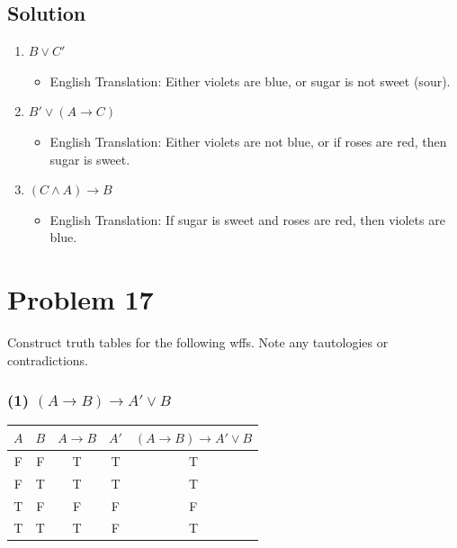 \documentclass[12pt]{article}
\begin{document}
\subsection*{Solution}
\begin{enumerate}
    \item \( B \lor C' \)
    \begin{itemize}
        \item English Translation: Either violets are blue, or sugar is not sweet (sour).
    \end{itemize}
    
    \item \( B' \lor (A \rightarrow C) \)
    \begin{itemize}
        \item English Translation: Either violets are not blue, or if roses are red, then sugar is sweet.
    \end{itemize}
    
    \item \( (C \land A) \rightarrow B \)
    \begin{itemize}
        \item English Translation: If sugar is sweet and roses are red, then violets are blue.
    \end{itemize}
\end{enumerate}


\newpage
\section*{Problem 17}
Construct truth tables for the following wffs. Note any tautologies or contradictions.

\subsubsection*{(1) \( (A \rightarrow B) \rightarrow A' \lor B \)}
\begin{tabular}{|c|c|c|c|c|}
\hline
\( A \) & \( B \) & \( A \rightarrow B \) & \( A' \) & \( (A \rightarrow B) \rightarrow A' \lor B \) \\
\hline
F & F & T & T & T \\
F & T & T & T & T \\
T & F & F & F & F \\
T & T & T & F & T \\
\hline
\end{tabular}
\end{document}
